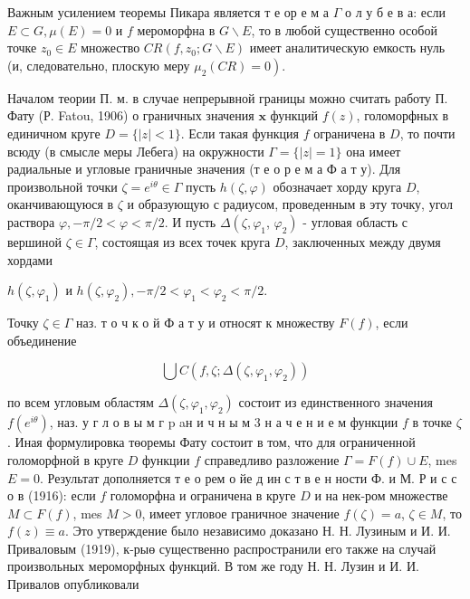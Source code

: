 \documentclass[10pt]{article}
\begin{document}
Важным усилением теоремы Пикара является т е ор е м а $\Gamma$ о л у б е в а: если $E \subset G, \mu(E)=0$ и $f$ мероморфна в $G \backslash E$, то в любой существенно особой точке $z_{0} \in E$ множество $C R\left(f, z_{0} ; G \backslash E\right)$ имеет аналитическую емкость нуль (и, следовательно, плоскую меру $\left.\mu_{2}(C R)=0\right)$.



Началом теории П. м. в случае непрерывной границы можно считать работу П. Фату (Р. Fatou, 1906) о граничных значения $\mathbf{x}$ функций $f(z)$, голоморфных в единичном круге $D=\{|z|<1\}$. Если такая функция $f$ ограничена в $D$, то почти всюду (в смысле меры Лебега) на окружности $\Gamma=\{|z|=1\}$ она имеет радиальные и угловые граничные значения (т е о р е м а Ф а т у). Для произвольной точки $\zeta=e^{i \theta} \in \Gamma$ пусть $h(\zeta, \varphi)$ обозначает хорду круга $D$, оканчивающуюся в $\zeta$ и образующую с радиусом, проведенным в эту точку, угол раствора $\varphi,-\pi / 2<\varphi<\pi / 2$. И пусть $\Delta\left(\zeta, \varphi_{1}\right.$, $\left.\varphi_{2}\right)$ - угловая область с вершиной $\zeta \in \Gamma$, состоящая из всех точек круга $D$, заключенных между двумя хордами



$h\left(\zeta, \varphi_{1}\right)$ и $h\left(\zeta, \varphi_{2}\right),-\pi / 2<\varphi_{1}<\varphi_{2}<\pi / 2$.



Точку $\zeta \in \Gamma$ наз. т о ч к о й Ф а т у и относят к множеству $F(f)$, если объединение



\[

\bigcup C\left(f, \zeta ; \Delta\left(\zeta, \varphi_{1}, \varphi_{2}\right)\right)

\]



по всем угловым областям $\Delta\left(\zeta, \varphi_{1}, \varphi_{2}\right)$ состоит из единственного значения $f\left(e^{i \theta}\right)$, наз. у г л о в ы м г p aн и ч н ы м 3 н а ч е н и е м функции $f$ в точке $\zeta$. Иная формулировка төоремы Фату состоит в том, что для ограниченной голоморфной в круге $D$ функции $f$ справедливо разложение $\Gamma=F(f) \cup E$, mes $E=0$. Результат дополняется т е о рем о йе д ин с т в е н ности Ф. и М. Р и с с о в (1916): если $f$ голоморфна и ограничена в круге $D$ и на нек-ром множестве $M \subset F(f)$, mes $M>0$, имеет угловое граничное значение $f(\zeta)=a$, $\zeta \in M$, то $f(z) \equiv a$. Это утверждение было независимо доказано Н. Н. Лузиным и И. И. Приваловым (1919), к-рыө существенно распространили его также на случай произвольных мероморфных функций. В том же году Н. Н. Лузин и И. И. Привалов опубликовали
\end{document}
